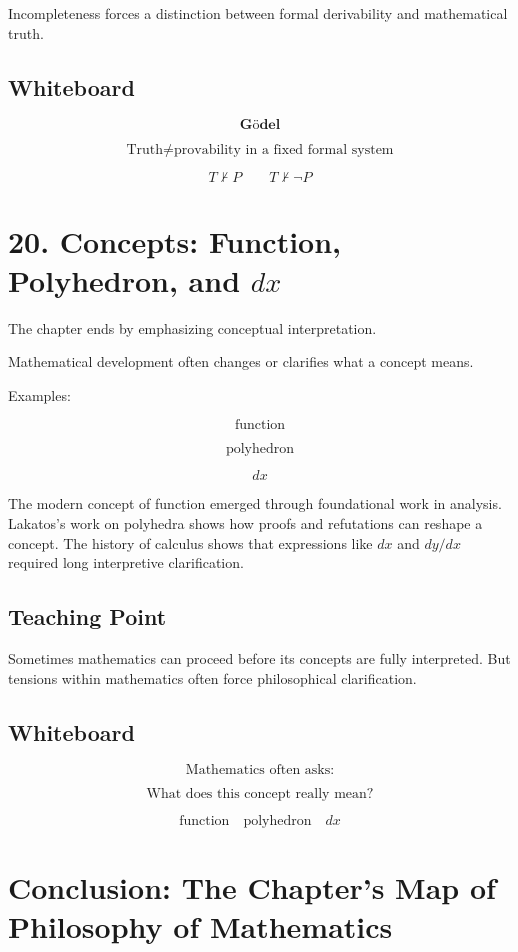 \documentclass[11pt]{article}
\begin{document}
Incompleteness forces a distinction between formal derivability and mathematical truth.

\subsection*{Whiteboard}

\[
\textbf{G\"odel}
\]

\[
\text{Truth} \neq \text{provability in a fixed formal system}
\]

\[
T \nvdash P
\qquad
T \nvdash \neg P
\]

\section*{20. Concepts: Function, Polyhedron, and \(dx\)}

The chapter ends by emphasizing conceptual interpretation.

Mathematical development often changes or clarifies what a concept means.

Examples:

\[
\text{function}
\]

\[
\text{polyhedron}
\]

\[
dx
\]

The modern concept of function emerged through foundational work in analysis.
Lakatos's work on polyhedra shows how proofs and refutations can reshape a concept.
The history of calculus shows that expressions like \(dx\) and \(dy/dx\) required long
interpretive clarification.

\subsection*{Teaching Point}

Sometimes mathematics can proceed before its concepts are fully interpreted. But tensions
within mathematics often force philosophical clarification.

\subsection*{Whiteboard}

\[
\text{Mathematics often asks:}
\]

\[
\text{What does this concept really mean?}
\]

\[
\text{function} \quad \text{polyhedron} \quad dx
\]

\section*{Conclusion: The Chapter's Map of Philosophy of Mathematics}
\end{document}
